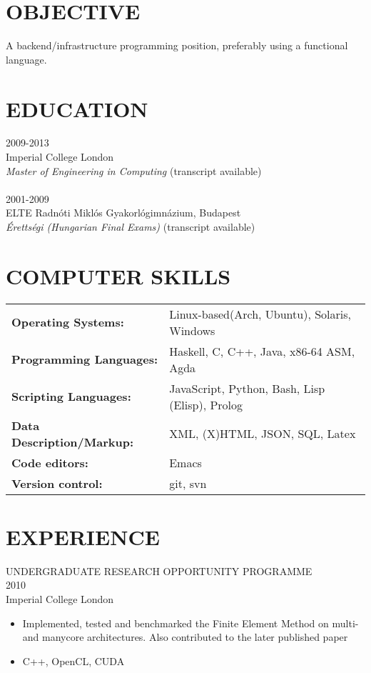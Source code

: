 \documentclass[11pt]{res} %
\begin{document}
\begin{resume}
                                               
 
\section{OBJECTIVE}
   A backend/infrastructure programming position, preferably using a functional language.
 
\section{EDUCATION}
2009-2013\\
Imperial College London\\
\emph{Master of Engineering in Computing} (transcript available)
\\
\\
2001-2009\\
ELTE Radnóti Miklós Gyakorlógimnázium, Budapest\\
\emph{Érettségi (Hungarian Final Exams)} (transcript available)

\section{COMPUTER SKILLS}
\begin{tabular}{ll}
\bf{Operating Systems}: & {Linux-based(Arch, Ubuntu), Solaris, Windows}\\
\bf{Programming Languages}: & {Haskell, C, C++, Java, x86-64 ASM, Agda}\\
\bf{Scripting Languages}: & {JavaScript, Python, Bash, Lisp (Elisp), Prolog}\\
\bf{Data Description/Markup}: & {XML, (X)HTML, JSON, SQL, Latex}\\
\bf{Code editors}: & {Emacs}\\
\bf{Version control}: & {git, svn}
\end{tabular}

\section{EXPERIENCE} 
UNDERGRADUATE RESEARCH OPPORTUNITY PROGRAMME\\
2010\\
Imperial College London
\vspace{0.2in}
   \begin{itemize} \itemsep -2pt  %
   \item Implemented, tested and benchmarked the Finite Element Method on multi- and manycore architectures. Also contributed to the later published paper\cite{markall0}
   \item C++, OpenCL, CUDA
 \end{itemize}


\end{resume}
\end{document}
